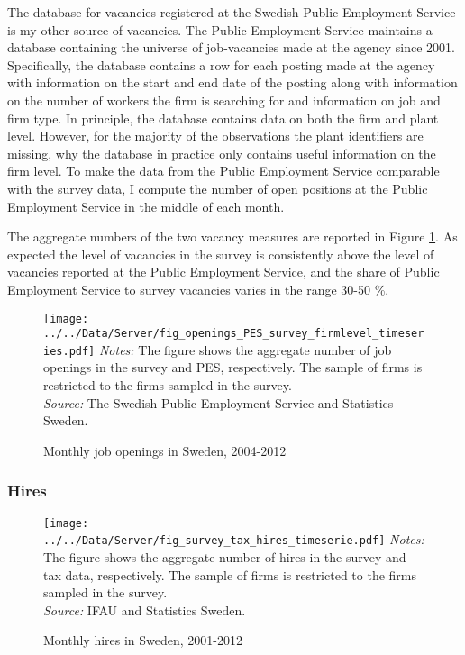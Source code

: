The database for vacancies registered at the Swedish Public Employment Service is my other source of vacancies. The  Public Employment Service maintains a database containing the universe of job-vacancies made at the agency since 2001. Specifically, the database contains a row for each posting made at the agency with information on the start and end date of the posting along with information on the number of workers the firm is searching for and information on job and firm type. In principle, the database contains data on both the firm and plant level. However, for the majority of the observations the plant identifiers are missing, why the database in practice 
only contains useful information on the firm level. To make the data from the Public Employment Service comparable with the survey data, I compute the number of open positions at the Public Employment Service in the middle of each month. 

The aggregate numbers of the two vacancy measures are reported in Figure \ref{fig:openings_timeserie}. As expected the level of vacancies in the survey is consistently above the level of vacancies reported at the Public Employment Service, and the share of Public Employment Service to survey vacancies varies in the range 30-50 \%. 

\begin{figure}[t]
\centering
\caption{Monthly job openings in Sweden, 2004-2012}
\texttt{[image: ../../Data/Server/fig\_openings\_PES\_survey\_firmlevel\_timeseries.pdf]}
\flushleft
\footnotesize{\emph{Notes:} The figure shows the aggregate number of job openings in the survey and PES, respectively. The sample of firms is restricted to the firms sampled in the survey.} \\
\footnotesize{\emph{Source:} The Swedish Public Employment Service and Statistics Sweden.}
\label{fig:openings_timeserie}
\end{figure}

\subsubsection{Hires}

\begin{figure}[t]
\centering
\caption{Monthly hires in Sweden, 2001-2012}
\texttt{[image: ../../Data/Server/fig\_survey\_tax\_hires\_timeserie.pdf]}
\flushleft
\footnotesize{\emph{Notes:} The figure shows the aggregate number of hires in the survey and tax data, respectively. The sample of firms is restricted to the firms sampled in the survey.} \\
\footnotesize{\emph{Source:} IFAU and Statistics Sweden.}
\label{fig:hires_timeserie}
\end{figure}

